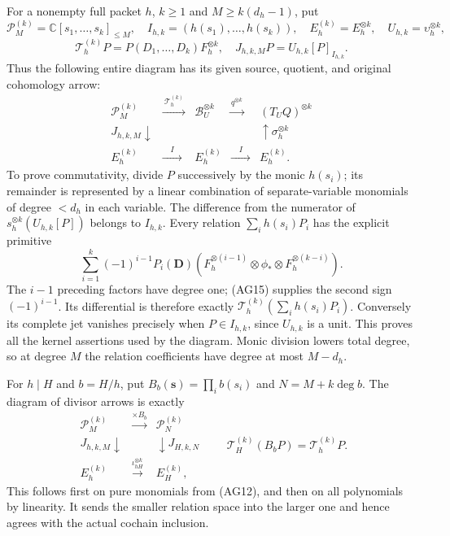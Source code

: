 For a nonempty full packet $h$, $k\ge1$ and $M\ge k(d_h-1)$, put
\[
 \mathcal P_M^{(k)}=\mathbb C[s_1,\ldots,s_k]_{\le M},\quad
 I_{h,k}=(h(s_1),\ldots,h(s_k)),\quad
 E_h^{(k)}=E_h^{\otimes k},\quad
 U_{h,k}=\upsilon_h^{\otimes k},
\]
\[
 \mathcal T_h^{(k)}P=P(D_1,\ldots,D_k)F_h^{\otimes k},
 \quad J_{h,k,M}P=U_{h,k}[P]_{I_{h,k}}.
 \tag{AG19}
\]
Thus the following entire diagram has its given source, quotient,
and original cohomology arrow:
\[
 \begin{array}{ccccc}
 \mathcal P_M^{(k)}&\xrightarrow{\ \mathcal T_h^{(k)}\ }
   &\mathscr B_U^{\otimes k}&\xrightarrow{q^{\otimes k}}
   &(T_UQ)^{\otimes k}\\
 J_{h,k,M}\downarrow&&&&\uparrow\sigma_h^{\otimes k}\\
 E_h^{(k)}&\xrightarrow{\quad I\quad}&E_h^{(k)}
      &\xrightarrow{\quad I\quad}&E_h^{(k)}.
 \end{array}\tag{AG20}
\]
To prove commutativity, divide $P$ successively by the monic
$h(s_i)$; its remainder is represented by a linear combination
of separate-variable monomials of degree $<d_h$ in each variable.
The difference from the numerator of
$s_h^{\otimes k}(U_{h,k}[P])$ belongs to $I_{h,k}$.
Every relation $\sum_i h(s_i)P_i$ has the explicit primitive
\[
 \sum_{i=1}^k(-1)^{i-1}P_i(\mathbf D)
 (F_h^{\otimes(i-1)}\otimes\phi_*\otimes
                       F_h^{\otimes(k-i)}).
 \tag{AG21}
\]
The $i-1$ preceding factors have degree one; (AG15) supplies the
second sign $(-1)^{i-1}$.  Its differential is therefore exactly
$\mathcal T_h^{(k)}(\sum_i h(s_i)P_i)$.
Conversely its complete jet vanishes precisely when $P\in I_{h,k}$,
since $U_{h,k}$ is a unit.  This proves all the kernel assertions
used by the diagram.  Monic division lowers total degree, so at
degree $M$ the relation coefficients have degree at most $M-d_h$.

For $h\mid H$ and $b=H/h$, put $B_b(\mathbf s)=\prod_i b(s_i)$
and $N=M+k\deg b$.  The diagram of divisor arrows is exactly
\[
 \begin{array}{ccc}
 \mathcal P_M^{(k)}&\xrightarrow{\times B_b}&\mathcal P_N^{(k)}\\
 J_{h,k,M}\downarrow&&\downarrow J_{H,k,N}\\
 E_h^{(k)}&\xrightarrow{\iota_{hH}^{\otimes k}}&E_H^{(k)},
 \end{array}
 \qquad
 \mathcal T_H^{(k)}(B_bP)=\mathcal T_h^{(k)}P.
 \tag{AG22}
\]
This follows first on pure monomials from (AG12), and then on all
polynomials by linearity.  It sends the smaller relation space into
the larger one and hence agrees with the actual cochain inclusion.

